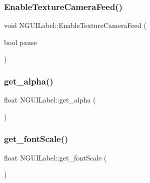 \hypertarget{class_n_g_u_i_label_a08df077b787d4a94b326ddb636edaa59}{}\label{class_n_g_u_i_label_a08df077b787d4a94b326ddb636edaa59} 
\subsubsection{\texorpdfstring{Enable\+Texture\+Camera\+Feed()}{EnableTextureCameraFeed()}}
{\footnotesize\ttfamily void N\+G\+U\+I\+Label\+::\+Enable\+Texture\+Camera\+Feed (\begin{DoxyParamCaption}\item[{bool}]{pause }\end{DoxyParamCaption})}

\hypertarget{class_n_g_u_i_label_abc0873a704582c23992025a0eea675de}{}\label{class_n_g_u_i_label_abc0873a704582c23992025a0eea675de} 
\subsubsection{\texorpdfstring{get\+\_\+alpha()}{get\_alpha()}}
{\footnotesize\ttfamily float N\+G\+U\+I\+Label\+::get\+\_\+alpha (\begin{DoxyParamCaption}{ }\end{DoxyParamCaption})}

\hypertarget{class_n_g_u_i_label_aca880b9732537f6298a86610e061046c}{}\label{class_n_g_u_i_label_aca880b9732537f6298a86610e061046c} 
\subsubsection{\texorpdfstring{get\+\_\+font\+Scale()}{get\_fontScale()}}
{\footnotesize\ttfamily float N\+G\+U\+I\+Label\+::get\+\_\+font\+Scale (\begin{DoxyParamCaption}{ }\end{DoxyParamCaption})}

\hypertarget{class_n_g_u_i_label_a832f11c241e5f97e1f5dbb993743b228}{}\label{class_n_g_u_i_label_a832f11c241e5f97e1f5dbb993743b228} 
